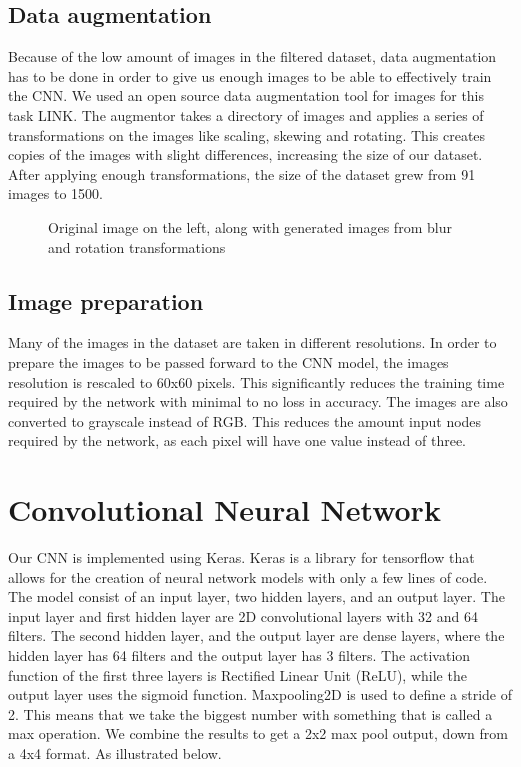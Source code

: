 \subsection{Data augmentation}\label{data augmentation}
Because of the low amount of images in the filtered dataset, data augmentation has to be done in order to give us enough images to be able to effectively train the CNN.
We used an open source data augmentation tool for images for this task LINK.
The augmentor takes a directory of images and applies a series of transformations on the images like scaling, skewing and rotating.
This creates copies of the images with slight differences, increasing the size of our dataset.
After applying enough transformations, the size of the dataset grew from 91 images to 1500.

\begin{figure}[h]
    \caption{Original image on the left, along with generated images from blur and rotation transformations}
    \label{fig:figure4.3}
\end{figure}

\subsection{Image preparation}\label{imgprep}
Many of the images in the dataset are taken in different resolutions.
In order to prepare the images to be passed forward to the CNN model, the images resolution is rescaled to 60x60 pixels.
This significantly reduces the training time required by the network with minimal to no loss in accuracy.
The images are also converted to grayscale instead of RGB.
This reduces the amount input nodes required by the network, as each pixel will have one value instead of three.

\section{Convolutional Neural Network}\label{sec:cnn}

Our CNN is implemented using Keras.
Keras is a library for tensorflow that allows for the creation of neural network models with only a few lines of code.
The model consist of an input layer, two hidden layers, and an output layer.
The input layer and first hidden layer are 2D convolutional layers with 32 and 64 filters.
The second hidden layer, and the output layer are dense layers, where the hidden layer has 64 filters and the output layer has 3 filters.
The activation function of the first three layers is Rectified Linear Unit (ReLU), while the output layer uses the sigmoid function.
Maxpooling2D is used to define a stride of 2.
This means that we take the biggest number with something that is called a max operation.
We combine the results to get a 2x2 max pool output, down from a 4x4 format.
As illustrated below.

